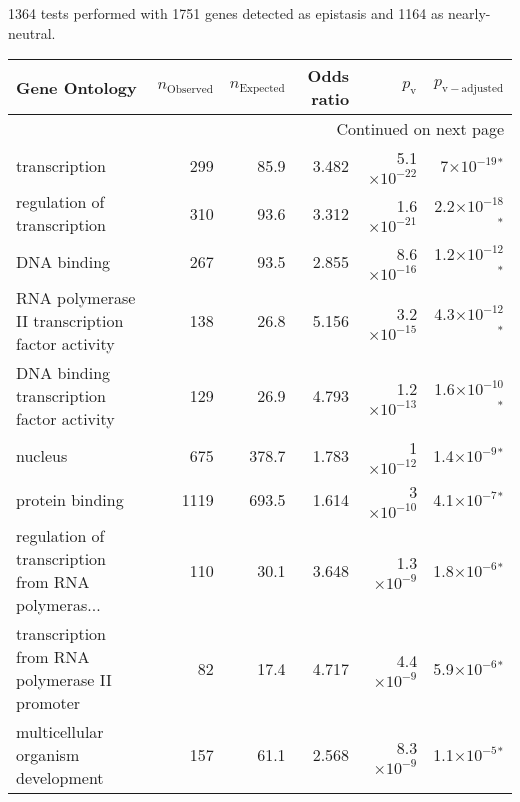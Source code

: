 1364 tests performed with 1751 genes detected as epistasis and 1164 as nearly-neutral.
\scriptsize
\begin{longtable}{|l|r|r|r|r|r|}
\toprule
                                     Gene Ontology & $n_{\mathrm{Observed}}$ & $n_{\mathrm{Expected}}$ & Odds ratio &     $p_{\mathrm{v}}$ &      $p_{\mathrm{v-adjusted}}$ \\
\midrule
\endhead
\midrule
\multicolumn{6}{r}{{Continued on next page}} \\
\midrule
\endfoot

\bottomrule
\endlastfoot
                                     transcription &                     299 &                    85.9 &      3.482 & 5.1$\times 10^{-22}$ &    7$\times 10^{-19}$$\bm{^*}$ \\
                       regulation of transcription &                     310 &                    93.6 &      3.312 & 1.6$\times 10^{-21}$ &  2.2$\times 10^{-18}$$\bm{^*}$ \\
                                       DNA binding &                     267 &                    93.5 &      2.855 & 8.6$\times 10^{-16}$ &  1.2$\times 10^{-12}$$\bm{^*}$ \\
   RNA polymerase II transcription factor activity &                     138 &                    26.8 &      5.156 & 3.2$\times 10^{-15}$ &  4.3$\times 10^{-12}$$\bm{^*}$ \\
         DNA binding transcription factor activity &                     129 &                    26.9 &      4.793 & 1.2$\times 10^{-13}$ &  1.6$\times 10^{-10}$$\bm{^*}$ \\
                                           nucleus &                     675 &                   378.7 &      1.783 &   1$\times 10^{-12}$ &   1.4$\times 10^{-9}$$\bm{^*}$ \\
                                   protein binding &                    1119 &                   693.5 &      1.614 &   3$\times 10^{-10}$ &   4.1$\times 10^{-7}$$\bm{^*}$ \\
 regulation of transcription from RNA polymeras... &                     110 &                    30.1 &      3.648 &  1.3$\times 10^{-9}$ &   1.8$\times 10^{-6}$$\bm{^*}$ \\
     transcription from RNA polymerase II promoter &                      82 &                    17.4 &      4.717 &  4.4$\times 10^{-9}$ &   5.9$\times 10^{-6}$$\bm{^*}$ \\
                multicellular organism development &                     157 &                    61.1 &      2.568 &  8.3$\times 10^{-9}$ &   1.1$\times 10^{-5}$$\bm{^*}$ \\

\end{longtable}
